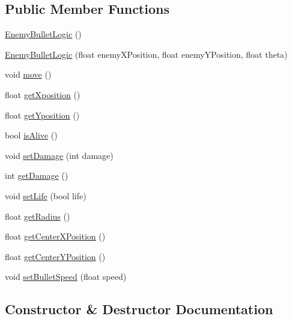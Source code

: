 \subsection*{Public Member Functions}
\begin{DoxyCompactItemize}
\item 
\hyperlink{class_enemy_bullet_logic_a0699eb27d52ed8651d611790f06e6661}{Enemy\+Bullet\+Logic} ()
\item 
\hyperlink{class_enemy_bullet_logic_a8f9f29a7c39830ccffc793adecf70c0e}{Enemy\+Bullet\+Logic} (float enemy\+X\+Position, float enemy\+Y\+Position, float theta)
\item 
void \hyperlink{class_enemy_bullet_logic_aaa5273b969347ce8c6e62261ccc3df3a}{move} ()
\item 
float \hyperlink{class_enemy_bullet_logic_afe73016d27c33171a20c15e11026106e}{get\+Xposition} ()
\item 
float \hyperlink{class_enemy_bullet_logic_a0cfb3013a7613f7f6de91a6db04d03b1}{get\+Yposition} ()
\item 
bool \hyperlink{class_enemy_bullet_logic_a42d10bdfde42178e272997de9b387398}{is\+Alive} ()
\item 
void \hyperlink{class_enemy_bullet_logic_a3e4ce40e06e9fa23826bd74015fd75f2}{set\+Damage} (int damage)
\item 
int \hyperlink{class_enemy_bullet_logic_a08dd084364fc7efc689a7f98e1cee688}{get\+Damage} ()
\item 
void \hyperlink{class_enemy_bullet_logic_a92e4dfb6a528114ad58f9ae64924fbab}{set\+Life} (bool life)
\item 
float \hyperlink{class_enemy_bullet_logic_a7e473b13bf07fdf8eb76b65e02879bf7}{get\+Radius} ()
\item 
float \hyperlink{class_enemy_bullet_logic_a39ffa8b7fabb84625a859691099652de}{get\+Center\+X\+Position} ()
\item 
float \hyperlink{class_enemy_bullet_logic_a4c006085f2a11f68e8043bca67d3effe}{get\+Center\+Y\+Position} ()
\item 
void \hyperlink{class_enemy_bullet_logic_a0263d2207f0d4332efa2cf8f8bbdc42c}{set\+Bullet\+Speed} (float speed)
\end{DoxyCompactItemize}


\subsection{Constructor \& Destructor Documentation}
\mbox{\label{class_enemy_bullet_logic_a0699eb27d52ed8651d611790f06e6661}} 
